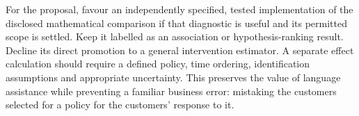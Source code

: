 For the proposal, favour an independently specified, tested implementation
of the disclosed mathematical comparison if that diagnostic is useful and
its permitted scope is settled. Keep it labelled as an association or
hypothesis-ranking result. Decline its direct promotion to a general
intervention estimator. A separate effect calculation should require a
defined policy, time ordering, identification assumptions and appropriate
uncertainty. This preserves the value of language assistance while preventing
a familiar business error: mistaking the customers selected for a policy
for the customers' response to it.
